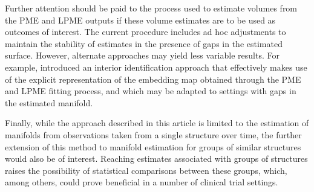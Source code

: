 \documentclass[11pt,reqno]{article}
\newcommand{\meng}[1]{{\color{purple} \sf $\clubsuit\clubsuit\clubsuit$ Kun Meng: [#1]}}
\theoremstyle{definition}
\begin{document}
Further attention should be paid to the process used to estimate volumes from the PME and LPME outputs if these volume estimates are to be used as outcomes of interest. The current procedure includes ad hoc adjustments to maintain the stability of estimates in the presence of gaps in the estimated surface. However, alternate approaches may yield less variable results. For example, \cite{mengPrincipalManifoldEstimation2021} introduced an interior identification approach that effectively makes use of the explicit representation of the embedding map obtained through the PME and LPME fitting process, and which may be adapted to settings with gaps in the estimated manifold.

Finally, while the approach described in this article is limited to the estimation of manifolds from observations taken from a single structure over time, the further extension of this method to manifold estimation for groups of similar structures would also be of interest. Reaching estimates associated with groups of structures raises the possibility of statistical comparisons between these groups, which, among others, could prove beneficial in a number of clinical trial settings.

\newpage

%
%
\printbibliography
\end{document}
